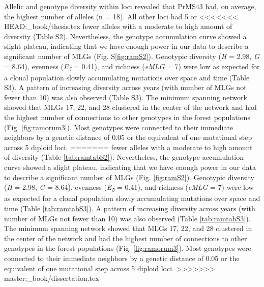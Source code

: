 \documentclass[double,12pt]{beavtex}
\begin{document}
  Allelic and genotype diversity within loci revealed that PrMS43 had, on
  average, the highest number of alleles (n = 18). All other loci had 5 or
<<<<<<< HEAD:_book/thesis.tex
  fewer alleles with a moderate to high amount of diversity (Table S2).
  Nevertheless, the genotype accumulation curve showed a slight plateau,
  indicating that we have enough power in our data to describe a
  significant number of MLGs (Fig. S\ref{fig:ramS2}). Genotypic diversity
  (\emph{H} = 2.98, \emph{G} = 8.64), evenness (\emph{E\textsubscript{5}}
  = 0.41), and richness (\emph{eMLG} = 7) were low as expected for a
  clonal population slowly accumulating mutations over space and time
  (Table S3). A pattern of increasing diversity across years (with number
  of MLGs not fewer than 10) was also observed (Table S3). The minimum
  spanning network showed that MLGs 17, 22, and 28 clustered in the center
  of the network and had the highest number of connections to other
  genotypes in the forest populations (Fig. \ref{fig:ramorum3}). Most
  genotypes were connected to their immediate neighbors by a genetic
  distance of 0.05 or the equivalent of one mutational step across 5
  diploid loci.
=======
  fewer alleles with a moderate to high amount of diversity (Table
  \ref{tab:ramtabS2}). Nevertheless, the genotype accumulation curve
  showed a slight plateau, indicating that we have enough power in our
  data to describe a significant number of MLGs (Fig. \ref{fig:ramS2}).
  Genotypic diversity (\emph{H} = 2.98, \emph{G} = 8.64), evenness
  (\emph{E\textsubscript{5}} = 0.41), and richness (\emph{eMLG} = 7) were
  low as expected for a clonal population slowly accumulating mutations
  over space and time (Table \ref{tab:ramtabS3}). A pattern of increasing
  diversity across years (with number of MLGs not fewer than 10) was also
  observed (Table \ref{tab:ramtabS3}). The minimum spanning network showed
  that MLGs 17, 22, and 28 clustered in the center of the network and had
  the highest number of connections to other genotypes in the forest
  populations (Fig. \ref{fig:ramorum3}). Most genotypes were connected to
  their immediate neighbors by a genetic distance of 0.05 or the
  equivalent of one mutational step across 5 diploid loci.
>>>>>>> master:_book/dissertation.tex
  
\end{document}
